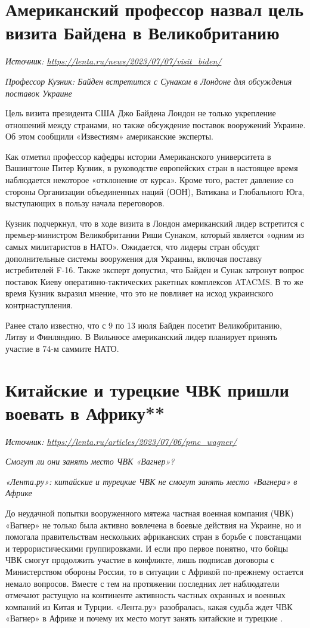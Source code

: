 \newpage
\section{Американский профессор назвал цель визита Байдена в Великобританию}

\textit{Источник: \url{https://lenta.ru/news/2023/07/07/visit_biden/}}

\textit{Профессор Кузник: Байден встретится с Сунаком в Лондоне для обсуждения поставок Украине}

Цель визита президента США Джо Байдена Лондон не только укрепление отношений между странами, но также обсуждение поставок вооружений Украине. Об этом сообщили «Известиям» американские эксперты.

Как отметил профессор кафедры истории Американского университета в Вашингтоне Питер Кузник, в руководстве европейских стран в настоящее время наблюдается некоторое «отклонение от курса». Кроме того, растет давление со стороны Организации объединенных наций (ООН), Ватикана и Глобального Юга, выступающих в пользу начала переговоров.

Кузник подчеркнул, что в ходе визита в Лондон американский лидер встретится с премьер-министром Великобритании Риши Сунаком, который является «одним из самых  милитаристов в НАТО». Ожидается, что лидеры стран обсудят дополнительные системы вооружения для Украины, включая поставку истребителей F-16. Также эксперт допустил, что Байден и Сунак затронут вопрос поставок Киеву оперативно-тактических ракетных комплексов ATACMS. В то же время Кузник выразил мнение, что это не повлияет на исход украинского контрнаступления.

Ранее стало известно, что с 9 по 13 июля Байден посетит Великобританию, Литву и Финляндию. В Вильнюсе американский лидер планирует принять участие в 74-м саммите НАТО.

\newpage
\section{Китайские и турецкие ЧВК пришли воевать в Африку**}

\textit{Источник: \url{https://lenta.ru/articles/2023/07/06/pmc_wagner/}}

\textit{Смогут ли они занять место ЧВК «Вагнер»?}

\textit{«Лента.ру»: китайские и турецкие ЧВК не смогут занять место «Вагнера» в Африке}

До неудачной попытки вооруженного мятежа частная военная компания (ЧВК) «Вагнер» не только была активно вовлечена в боевые действия на Украине, но и помогала правительствам нескольких африканских стран в борьбе с повстанцами и террористическими группировками. И если про первое понятно, что бойцы ЧВК смогут продолжить участие в конфликте, лишь подписав договоры с Министерством обороны России, то в ситуации с Африкой по-прежнему остается немало вопросов. Вместе с тем на протяжении последних лет наблюдатели отмечают растущую на континенте активность частных охранных и военных компаний из Китая и Турции. «Лента.ру» разобралась, какая судьба ждет  ЧВК «Вагнер» в Африке и почему их место могут занять китайские и турецкие .


